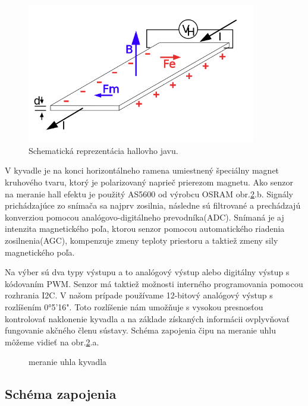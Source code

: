 \begin{figure}[!tbh]
	\centering
	\includegraphics[width=100mm]{obr/hallovjav.png}
	\caption{Schematická reprezentácia hallovho javu.}\label{OBRAZOK 1.323}
\end{figure}

V kyvadle je na konci horizontálneho ramena umiestnený špeciálny magnet kruhového tvaru, ktorý je polarizovaný naprieč prierezom magnetu. Ako senzor na meranie hall efektu je použitý AS5600 od výrobcu OSRAM obr.\ref{OBRAZOK 2.2}.b. Signály prichádzajúce zo snímača sa najprv zosilnia, následne sú filtrované a prechádzajú konverziou pomocou analógovo-digitálneho prevodníka(ADC). Snímaná je aj intenzita magnetického poľa, ktorou senzor pomocou
automatického riadenia zosilnenia(AGC), kompenzuje zmeny teploty priestoru a taktiež zmeny sily magnetického poľa.

Na výber sú dva typy výstupu a to analógový výstup alebo digitálny výstup s kódovaním PWM. Senzor má taktiež možnosti interného programovania pomocou rozhrania I2C.
V našom prípade používame 12-bitový analógový výstup s rozlíšením 0°5'16". Toto rozlíšenie nám umožňuje s vysokou presnosťou kontrolovať naklonenie kyvadla a na základe získaných informácii ovplyvňovať fungovanie akčného členu sústavy. Schéma zapojenia čipu na meranie uhlu môžeme vidieť na obr.\ref{OBRAZOK 2.2}.a.



\begin{figure}[!tbh]
	\hfill
	\hfill
	\hfill
	\caption{meranie uhla kyvadla}\label{OBRAZOK 2.2}
\end{figure}

\newpage


\subsection{Schéma zapojenia}

